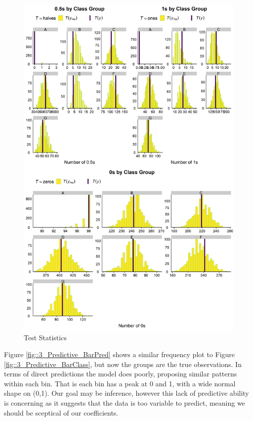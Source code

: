 \documentclass[11pt,twoside]{article}
\numberwithin{Theorem}{section}
\numberwithin{Definition}{section}
\numberwithin{Lemma}{section}
\numberwithin{Algorithm}{section}
\numberwithin{equation}{section}
\begin{document}
\begin{figure}[h!]
	\centering
	\includegraphics[height = 0.8\textheight]{Figures/3_1_Primary_PostPred_Stats.png}
	\caption{Test Statistics} \label{fig::3_Predictive_Stats}	
\end{figure}

\newpage

Figure \ref{fig::3_Predictive_BarPred} shows a similar frequency plot to Figure \ref{fig::3_Predictive_BarClass}, but now the groups are the true observations. In terms of direct predictions the model does poorly, proposing similar patterns within each bin. That is each bin has a peak at 0 and 1, with a wide normal shape on (0,1). Our goal may be inference, however this lack of predictive ability is concerning as it suggests that the data is too variable to predict, meaning we should be sceptical of our coefficients. 
\end{document}
